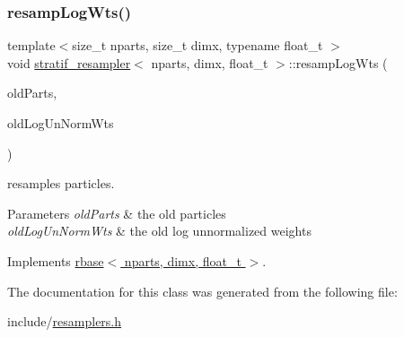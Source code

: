 \subsubsection{\texorpdfstring{resamp\+Log\+Wts()}{resampLogWts()}}
{\footnotesize\ttfamily template$<$size\+\_\+t nparts, size\+\_\+t dimx, typename float\+\_\+t $>$ \\
void \hyperlink{classstratif__resampler}{stratif\+\_\+resampler}$<$ nparts, dimx, float\+\_\+t $>$\+::resamp\+Log\+Wts (\begin{DoxyParamCaption}\item[{\hyperlink{classrbase_aa12fc826befa6ba0647b5f59ebc396ee}{array\+Vec} \&}]{old\+Parts,  }\item[{\hyperlink{classrbase_a6f76bef853e508cb5b6f546d231b06f5}{array\+Float} \&}]{old\+Log\+Un\+Norm\+Wts }\end{DoxyParamCaption})\hspace{0.3cm}{\ttfamily [virtual]}}



resamples particles. 


\begin{DoxyParams}{Parameters}
{\em old\+Parts} & the old particles \\
\hline
{\em old\+Log\+Un\+Norm\+Wts} & the old log unnormalized weights \\
\hline
\end{DoxyParams}


Implements \hyperlink{classrbase_aff0f6f88fd4656e67f5ebc870f10dd44}{rbase$<$ nparts, dimx, float\+\_\+t $>$}.



The documentation for this class was generated from the following file\+:\begin{DoxyCompactItemize}
\item 
include/\hyperlink{resamplers_8h}{resamplers.\+h}\end{DoxyCompactItemize}
